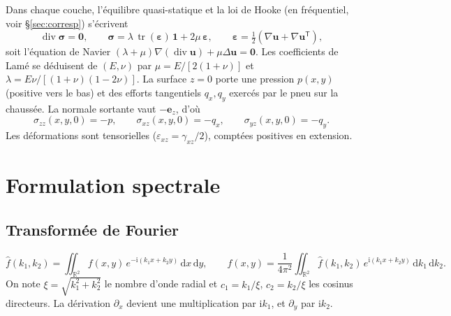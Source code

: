 \documentclass[11pt,a4paper]{article}
\newcommand{\dd}{\mathrm{d}}
\newcommand{\ii}{\mathrm{i}}
\newcommand{\hatt}[1]{\widehat{#1}}
\renewcommand{\epsilon}{\varepsilon}
\begin{document}
Dans chaque couche, l'équilibre quasi-statique et la loi de Hooke (en fréquentiel, voir \S\ref{sec:corresp}) s'écrivent
\begin{equation}
\operatorname{div}\bm\sigma=\bm 0,\qquad
\bm\sigma=\lambda\,\operatorname{tr}(\bm\epsilon)\,\bm 1+2\mu\,\bm\epsilon,\qquad
\bm\epsilon=\tfrac12(\nabla\bm u+\nabla\bm u^{\mathsf T}),
\end{equation}
soit l'équation de Navier $(\lambda+\mu)\nabla(\operatorname{div}\bm u)+\mu\Delta\bm u=\bm 0$.
Les coefficients de Lamé se déduisent de $(E,\nu)$ par
$\mu=E/[2(1+\nu)]$ et $\lambda=E\nu/[(1+\nu)(1-2\nu)]$.
La surface $z=0$ porte une pression $p(x,y)$ (positive vers le bas) et des efforts tangentiels
$q_x,q_y$ exercés par le pneu sur la chaussée. La normale sortante vaut $-\bm e_z$, d'où
\begin{equation}
\sigma_{zz}(x,y,0)=-p,\qquad \sigma_{xz}(x,y,0)=-q_x,\qquad \sigma_{yz}(x,y,0)=-q_y .
\label{eq:cl_surface}
\end{equation}
Les déformations sont tensorielles ($\epsilon_{xz}=\gamma_{xz}/2$), comptées positives en extension.

\section{Formulation spectrale}
\subsection{Transformée de Fourier}
\begin{equation}
\hatt f(k_1,k_2)=\iint_{\mathbb R^2} f(x,y)\,e^{-\ii(k_1x+k_2y)}\,\dd x\,\dd y,\qquad
f(x,y)=\frac{1}{4\pi^2}\iint_{\mathbb R^2}\hatt f(k_1,k_2)\,e^{\ii(k_1x+k_2y)}\,\dd k_1\,\dd k_2 .
\end{equation}
On note $\xi=\sqrt{k_1^2+k_2^2}$ le nombre d'onde radial et $c_1=k_1/\xi$, $c_2=k_2/\xi$ les
cosinus directeurs. La dérivation $\partial_x$ devient une multiplication par $\ii k_1$, et
$\partial_y$ par $\ii k_2$.
\end{document}
